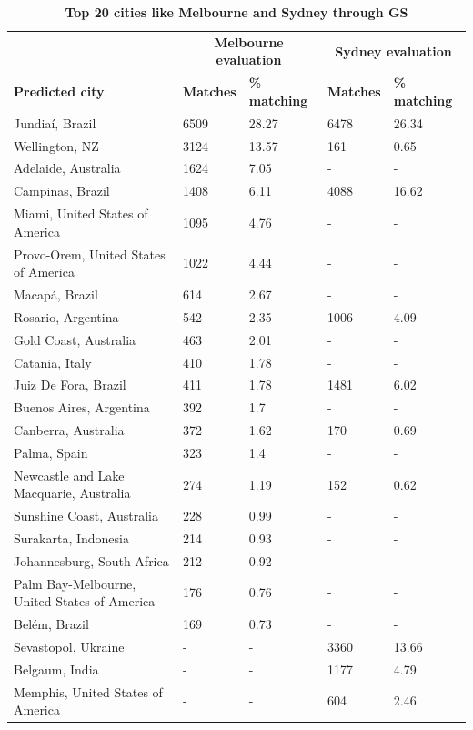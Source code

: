 \documentclass[10pt,letterpaper]{article}
\begin{document}
\begin{table}[!htbp]
\begin{adjustwidth}{-2.25in}{0in}
\caption{\bf Top 20 cities like Melbourne and Sydney through GS \label{tab:melbournesydneyGS}}     
\begin{tabular}{ l  l l l  l}
 \hline    &  \multicolumn{2}{c}{\textbf{Melbourne evaluation}} & \multicolumn{2}{c}{\textbf{Sydney evaluation}}  \\  
\textbf{Predicted city} & \textbf{Matches} & \textbf{\% matching}  & \textbf{Matches} & \textbf{\% matching}\\ \hline
Jundia\'{i}, Brazil & 6509 & 28.27 & 6478 & 26.34 \\ 
Wellington, NZ & 3124 & 13.57 & 161 & 0.65 \\ 
Adelaide, Australia & 1624 & 7.05 &-&- \\ 
Campinas, Brazil & 1408 & 6.11 & 4088 & 16.62 \\ 
Miami, United States of America & 1095 & 4.76 &-&- \\ 
Provo-Orem, United States of America & 1022 & 4.44 &-&- \\ 
Macap\'{a}, Brazil & 614 & 2.67 &-&- \\ 
Rosario, Argentina & 542 & 2.35 & 1006 & 4.09 \\ 
Gold Coast, Australia & 463 & 2.01 &-&- \\ 
Catania, Italy & 410 & 1.78 &-&- \\ 
Juiz De Fora, Brazil & 411 & 1.78 & 1481 & 6.02 \\ 
Buenos Aires, Argentina & 392 & 1.7 &-&- \\ 
Canberra, Australia & 372 & 1.62 & 170 & 0.69 \\ 
Palma, Spain & 323 & 1.4 &-&- \\ 
Newcastle and Lake Macquarie, Australia & 274 & 1.19 & 152 & 0.62 \\ 
Sunshine Coast, Australia & 228 & 0.99 &-&- \\ 
Surakarta, Indonesia & 214 & 0.93 &-&- \\ 
Johannesburg, South Africa & 212 & 0.92 &-&- \\ 
Palm Bay-Melbourne, United States of America & 176 & 0.76 &-&- \\ 
Bel\'{e}m, Brazil & 169 & 0.73 &-&- \\ 
Sevastopol, Ukraine &-&- & 3360 & 13.66\\ 
Belgaum, India &-&- & 1177 & 4.79\\ 
Memphis, United States of America &-&- & 604 & 2.46\\ 

\end{tabular}
\end{adjustwidth}
\end{table}
\end{document}
